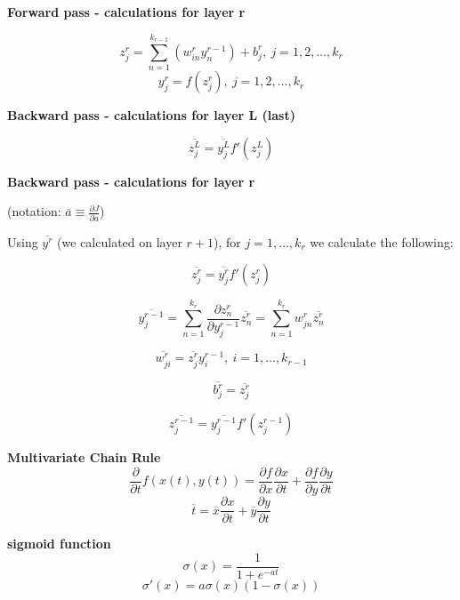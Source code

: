 \documentclass{report}
\begin{document}
\begin{figure}[H]
\end{figure}

\textbf{Forward pass - calculations for layer r}

\[z_j^r = \sum_{n=1}^{k_{r-1}} \left( w_{in}^r y_n^{r-1} \right) + b_j^r,\ j=1, 2, \ldots, k_r\]
\[y_j^r = f(z_j^r),\ j=1, 2, \ldots, k_r\]

\textbf{Backward pass - calculations for layer L (last)}

\[\overline{z_j^L} = \overline{y_j^L} f'(z_j^L)\]

\textbf{Backward pass - calculations for layer r}

(notation: $\overline{a} \equiv \frac{\partial J}{\partial a}$)

Using $\overline{y^r}$ (we calculated on layer $r+1$), for $j=1, \ldots, k_r$ we calculate the following:

\[\overline{z_j^r} = \overline{y_j^r} f'(z_j^r)\]

\[\overline{y_j^{r-1}} = \sum_{n=1}^{k_{r}} \frac{\partial z_n^r}{\partial y_j^{r-1}} \overline{z_n^r} = \sum_{n=1}^{k_{r}} w_{jn}^r \overline{z_n^r}\]

\[\overline{w_{ji}^r} = \overline{z_j^r} y_i^{r-1},\ i=1, \ldots, k_{r-1}\]

\[\overline{b_j^r} = \overline{z_j^r}\]

\[\overline{z_j^{r-1}} = \overline{y_j^{r-1}} f'(z_j^{r-1})\]

\textbf{Multivariate Chain Rule}
\[\frac{\partial}{\partial t} f(x(t), y(t)) = \frac{\partial f}{\partial x} \frac{\partial x}{\partial t} + \frac{\partial f}{\partial y} \frac{\partial y}{\partial t}\]
\[\overline{t} = \overline{x} \frac{\partial x}{\partial t} + \overline{y} \frac{\partial y}{\partial t}\]

\textbf{sigmoid function}
\[\sigma(x) = \frac{1}{1+e^{-at}}\]
\[\sigma'(x) = a \sigma(x) (1-\sigma(x))\]
\end{document}
